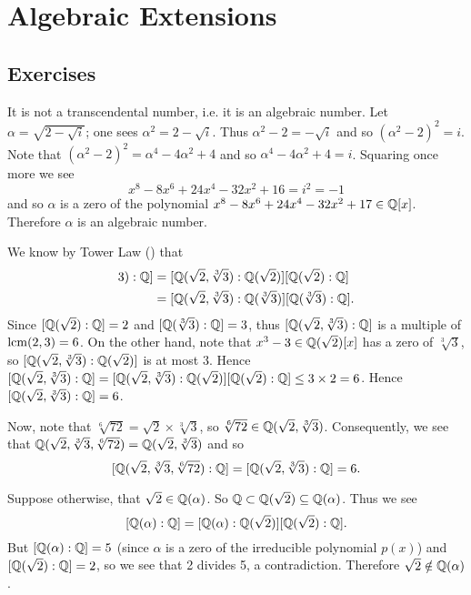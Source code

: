 \section{Algebraic Extensions}
\subsection*{Exercises}
\begin{questions}
    \item It is not a transcendental number, i.e. it is an algebraic number. Let $\alpha = \sqrt{2-\sqrt{i}}$; one sees $\alpha^2 = 2 - \sqrt{i}$. Thus $\alpha^2 - 2 = -\sqrt{i}$ and so $(\alpha^2-2)^2 = i$. Note that $(\alpha^2 - 2)^2 = \alpha^4 - 4\alpha^2 + 4$ and so $\alpha^4 - 4\alpha^2 + 4 = i$. Squaring once more we see
    \[
        x^8 - 8x^6 + 24x^4 - 32x^2 + 16 = i^2 = -1
    \]
    and so $\alpha$ is a zero of the polynomial $x^8 - 8x^6 + 24x^4 - 32x^2 + 17 \in \mathbb{Q}[x]$. Therefore $\alpha$ is an algebraic number.

    \item We know by Tower Law () that
    \begin{align*}
        [\Q(\sqrt2, \sqrt[3]3): \Q] &= [\Q(\sqrt2, \sqrt[3]3): \Q(\sqrt2)][\Q(\sqrt2):\Q]\\
        &= [\Q(\sqrt2, \sqrt[3]3): \Q(\sqrt[3]3)][\Q(\sqrt[3]3):\Q].
    \end{align*}
    Since $[\mathbb{Q}(\sqrt2):\mathbb{Q}] = 2$ and $[\mathbb{Q}(\sqrt[3]3):\mathbb{Q}] = 3$, thus $[\mathbb{Q}(\sqrt2, \sqrt[3]3): \mathbb{Q}]$ is a multiple of $\mathrm{lcm}(2, 3) = 6$. On the other hand, note that $x^3 - 3 \in \mathbb{Q}(\sqrt2)[x]$ has a zero of $\sqrt[3]3$, so $[\mathbb{Q}(\sqrt2, \sqrt[3]3): \mathbb{Q}(\sqrt2)]$ is at most 3. Hence $[\mathbb{Q}(\sqrt2, \sqrt[3]3): \mathbb{Q}] = [\mathbb{Q}(\sqrt2, \sqrt[3]3): \mathbb{Q}(\sqrt2)][\mathbb{Q}(\sqrt2):\mathbb{Q}] \leq 3 \times 2 = 6$. Hence $[\mathbb{Q}(\sqrt2, \sqrt[3]3): \mathbb{Q}] = 6$.

    Now, note that $\sqrt[6]{72} = \sqrt2 \times \sqrt[3]3$, so $\sqrt[6]{72} \in \mathbb{Q}(\sqrt2, \sqrt[3]3)$. Consequently, we see that $\mathbb{Q}(\sqrt2, \sqrt[3]3, \sqrt[6]{72}) = \mathbb{Q}(\sqrt2, \sqrt[3]3)$ and so
    \[
        [\mathbb{Q}(\sqrt2, \sqrt[3]3, \sqrt[6]{72}):\mathbb{Q}] = [\mathbb{Q}(\sqrt2, \sqrt[3]3): \mathbb{Q}] = 6.
    \]

    \item Suppose otherwise, that $\sqrt2 \in \mathbb{Q}(\alpha)$. So $\mathbb{Q} \subset \mathbb{Q}(\sqrt2) \subseteq \mathbb{Q}(\alpha)$. Thus we see
    \[
        [\mathbb{Q}(\alpha): \mathbb{Q}] = [\mathbb{Q}(\alpha):\mathbb{Q}(\sqrt2)][\mathbb{Q}(\sqrt2):\mathbb{Q}].
    \]
    But $[\mathbb{Q}(\alpha): \mathbb{Q}] = 5$ (since $\alpha$ is a zero of the irreducible polynomial $p(x)$) and $[\mathbb{Q}(\sqrt2):\mathbb{Q}] = 2$, so we see that 2 divides 5, a contradiction. Therefore $\sqrt2 \notin \mathbb{Q}(\alpha)$.


\end{questions}
